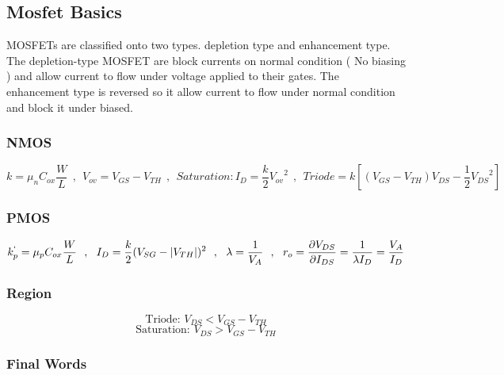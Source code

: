 \subsection{Mosfet Basics}
MOSFETs are classified onto two types. depletion type and enhancement type. The depletion-type MOSFET are block currents on normal condition ( No biasing ) and allow current to flow under voltage applied to their gates. The enhancement type is reversed so it allow current to flow under normal condition and block it under biased.
\subsubsection{NMOS}
$$ k = {\mu}_n C_{ox} \frac{W}{L} ~~ , ~~ V_{ov} = V_{GS} - V_{TH} ~~, ~~  Saturation: I_D = \frac{k}{2} {V_{ov}}^2 ~~,~~ Triode = k [(V_{GS} - V_{TH})V_{DS} - \frac{1}{2}{V_{DS}}^2]$$
\par
\subsubsection{PMOS}
$$ k^{`}_p = {\mu}_p C_{ox} \frac{W}{L} ~~, ~~ I_D = \frac{k}{2} (V_{SG} - |V_{TH}|)^2 ~~,~~ 
\lambda = \frac{1}{V_A} ~~, ~~ r_o = \frac{\partial V_{DS}}{\partial I_{DS}} = \frac{1}{\lambda  I_D} = \frac{V_A}{I_D}$$
\subsubsection{Region}
$$ \text{Triode:~} V_{DS} < V_{GS} - V_{TH} $$
$$ \text{Saturation:~} V_{DS} > V_{GS} - V_{TH} $$
\subsubsection{Final Words}
\lipsum[60-63]
